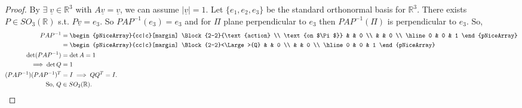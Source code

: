 \begin{proof}
    By  $\exists \; \underline{v} \in \mathbb{R}^3$ with $A \underline{v} = \underline{v}$, we can assume $|\underline{v}| = 1$.
    Let $\{e_1, e_2, e_3\}$ be the standard orthonormal basis for $\mathbb{R}^3$.
    There exists $P \in SO_3(\mathbb{R})$ s.t. $P \underline{v} = e_3$.
    So $PAP^{-1}(e_3) = e_3$ and for $\Pi$ plane perpendicular to $e_3$ then $PAP^{-1}(\Pi)$ is perpendicular to $e_3$.
    So, 
    \begin{align*}
        PAP^{-1} &= \begin{pNiceArray}{cc|c}[margin]
            \Block{2-2}{\text{action} \\ \text{on $\Pi$}} & & 0 \\
            & & 0 \\
            \hline
            0 & 0 & 1
            \end{pNiceArray} \\
            &= \begin{pNiceArray}{cc|c}[margin]
                \Block{2-2}<\Large>{Q} & & 0 \\
                & & 0 \\
                \hline
                0 & 0 & 1
                \end{pNiceArray} \\
            \det (P A P^{-1}) &= \det A = 1 \\
            \implies \det Q &= 1 \\
            (P A P^{-1}) (P A P^{-1})^T &= I \implies Q Q^T = I.\\
            \text{So, } Q &\in SO_2(\mathbb{R}).
    \end{align*} 
\end{proof}  

